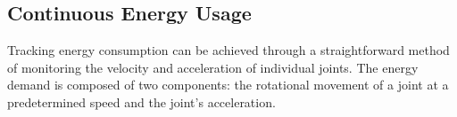 \subsection{Continuous Energy Usage}
Tracking energy consumption can be achieved through a straightforward method of monitoring the velocity and acceleration of individual joints. The energy demand is composed of two components: the rotational movement of a joint at a predetermined speed and the joint's acceleration.

